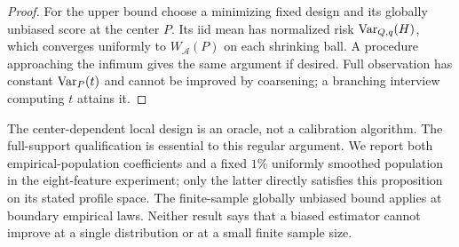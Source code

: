 \begin{proof}
For the upper bound choose a minimizing fixed design and its globally
unbiased score at the center $P$. Its iid mean has normalized risk
$\operatorname{Var}_{Q,q}(H)$, which converges uniformly to $W_{\mathcal A}(P)$ on each
shrinking ball. A procedure approaching the infimum gives the same argument
if desired. Full observation has constant $\operatorname{Var}_P(t)$ and cannot be improved
by coarsening; a branching interview computing $t$ attains it.
\end{proof}

The center-dependent local design is an oracle, not a calibration algorithm.
The full-support qualification is essential to this regular argument. We
report both empirical-population coefficients and a fixed $1\%$
uniformly smoothed population in the eight-feature experiment; only the
latter directly satisfies this proposition on its stated profile space.
The finite-sample globally unbiased bound applies at
boundary empirical laws. Neither result says that a biased estimator cannot
improve at a single distribution or at a small finite sample size.
